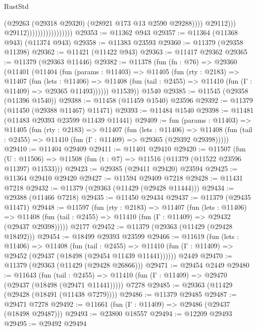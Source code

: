 \begin{lexlean}{RustStd}
\begin{coremodule}
                                                (@29263
                                                  (@29318 @29320)
                                                  (@28921 @173 @13 @2590 @29288))))
                                            @29112)))
                                      @29112)))))))))))))))))
@29353 := @11362 @943
@29357 := @11364 (@11368 @943) (@11374 @943)
@29358 := @11383 @23593
@29360 := @11379 (@29358 @11398)
@29362 := @11421 (@11422 @943)
@29363 := @11417 @29362
@29365 := @11379 (@29363 @11446)
@29382 := @11378
    (fun (fn : @76) =>
    @29360
      (@11401
        (@11404
          (fun (params : @11403) =>
          @11405
            (fun (rty : @2183) =>
            @11407
              (fun (lets : @11406) =>
              @11408 (fun (tail : @2455) => @11410 (fun (Γ : @11409) => @29365 @11493))))))
        @11539))
    @1540
@29385 := @11545 (@29358 (@11396 @1540))
@29388 := @11458 (@11459 @1540) @23596
@29392 := @11379 (@11450 (@29388 @11467) @11471)
@29393 := @11484 @1540
@29398 := @11481 (@11483 @29393 @23599 @11439 @11441)
@29409 := fun (params : @11403) =>
  @11405
    (fun (rty : @2183) =>
    @11407
      (fun (lets : @11406) =>
      @11408 (fun (tail : @2455) => @11410 (fun (Γ : @11409) => @29365 (@29392 @29398)))))
@29410 := @11404 @29409
@29411 := @11401 @29410
@29420 := @11507
    (fun (U : @11506) => @11508 (fun (t : @7) => @11516 (@11379 (@11522 @23596 @11397) @11533)))
@29423 := @29385 (@29411 @29420) @23594
@29425 := @11364 @29410 @29420
@29427 := @11594 @29409 @7218
@29428 := @11431 @7218
@29432 := @11379 (@29363 (@11429 (@29428 @11444)))
@29434 := @29388 (@11466 @7218)
@29435 := @11450 @29434
@29437 := @11379 (@29435 @11471)
@29448 := @11597
    (fun (rty : @2183) =>
    @11407
      (fun (lets : @11406) =>
      @11408 (fun (tail : @2455) => @11410 (fun (Γ : @11409) => @29432 (@29437 @29398)))))
    @2177
@29452 := @11379 (@29363 (@11429 (@29428 @18492)))
@29454 := @18499 @29393 @23599
@29466 := @11619
    (fun (lets : @11406) =>
    @11408
      (fun (tail : @2455) =>
      @11410 (fun (Γ : @11409) => @29452 (@29437 (@18498 (@29454 @11439 @11441))))))
    @2449
@29470 := @11379 (@29363 (@11429 (@29428 @26866)))
@29471 := @29454 @2449
@29480 := @11643
    (fun (tail : @2455) => @11410 (fun (Γ : @11409) => @29470 (@29437 (@18498 (@29471 @11441)))))
    @7278
@29485 := @29363 (@11429 (@29428 (@18491 (@11438 @7279))))
@29486 := @11379 @29485
@29487 := @29471 @7278
@29492 := @11661 (fun (Γ : @11409) => @29486 (@29437 (@18498 @29487)))
@29493 := @23800 @18557
@29494 := @12209 @29493
@29495 := @29492 @29494

\end{coremodule}
\end{lexlean}
